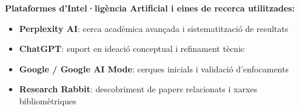 \documentclass[11pt,a4paper]{article}
\begin{document}
\vspace{0.5cm}

\noindent\textbf{Plataformes d'Intel·ligència Artificial i eines de recerca utilitzades:}
\begin{itemize}
\item \textbf{Perplexity AI}: cerca acadèmica avançada i sistematització de resultats
\item \textbf{ChatGPT}: suport en ideació conceptual i refinament tècnic
\item \textbf{Google / Google AI Mode}: cerques inicials i validació d'enfocaments
\item \textbf{Research Rabbit}: descobriment de papers relacionats i xarxes bibliomètriques
\end{itemize}
\end{document}
